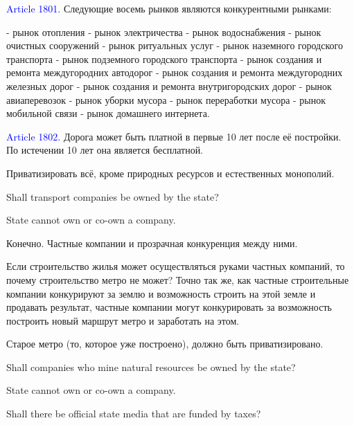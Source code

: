 \documentclass[11pt]{article}
\theoremstyle{remark}
\theoremstyle{definition}
\begin{document}
\textcolor{blue}{Article 1801.} Следующие восемь рынков являются конкурентными рынками:

- рынок отопления
- рынок электричества
- рынок водоснабжения
- рынок очистных сооружений
- рынок ритуальных услуг
- рынок наземного городского транспорта
- рынок подземного городского транспорта
- рынок создания и ремонта междугородних автодорог
- рынок создания и ремонта междугородних железных дорог
- рынок создания и ремонта внутригородских дорог
- рынок авиаперевозок
- рынок уборки мусора
- рынок переработки мусора
- рынок мобильной связи
- рынок домашнего интернета.



\textcolor{blue}{Article 1802.} Дорога может быть платной в первые 10 лет после её постройки. По истечении 10 лет она является бесплатной.


Приватизировать всё, кроме природных ресурсов и естественных монополий.


Shall transport companies be owned by the state?

State cannot own or co-own a company.

Конечно. Частные компании и прозрачная конкуренция между ними.

Если строительство жилья может осуществляться руками частных компаний, то почему строительство метро не может? Точно так же, как частные строительные компании конкурируют за землю и возможность строить на этой земле и продавать результат, частные компании могут конкурировать за возможность построить новый маршрут метро и заработать на этом.


Старое метро (то, которое уже построено), должно быть приватизировано. %



Shall companies who mine natural resources be owned by the state?

State cannot own or co-own a company.

Shall there be official state media that are funded by taxes?
\end{document}
